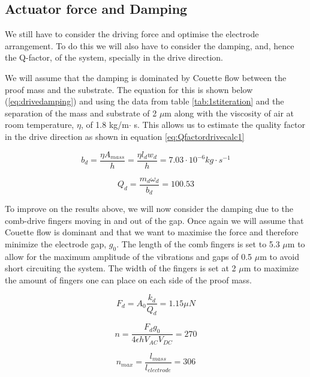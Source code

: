 \documentclass[12pt,a4paper,titlepage]{article}
\begin{document}
\begin{spacing}{1.1}
\subsection{Actuator force and Damping}

We still have to consider the driving force and optimise the electrode arrangement. To do this we will also have to consider the damping, and, hence the Q-factor, of the system, specially in the drive direction.

We will assume that the damping is dominated by Couette flow between the proof mass and the substrate. The equation for this is shown below (\ref{eq:drivedamping}) and using the data from table \ref{tab:1stiteration} and the separation of the mass and substrate of 2 $\mu$m along with the viscosity of air at room temperature, $\eta$, of 1.8 kg/m$\cdot$ s. This allows us to estimate the quality factor in the drive direction as shown in equation \ref{eq:Qfactordrivecalc1}

\begin{equation}
b_d = \dfrac{\eta A_{mass}}{h}= \dfrac{\eta l_d w_d}{h} = 7.03\cdot 10^{-6} kg \cdot s^{-1}
\label{eq:drivedamping}
\end{equation}

\begin{equation}
Q_d = \dfrac{m_d \omega_d}{b_d} = 100.53
\label{eq:Qfactordrivecalc1}
\end{equation}

To improve on the results above, we will now consider the damping due to the comb-drive fingers moving in and out of the gap. Once again we will assume that Couette flow is dominant and that we want to maximise the force and therefore minimize the electrode gap, $g_0$. The length of the comb fingers is set to 5.3 $\mu$m to allow for the maximum amplitude of the vibrations and gaps of 0.5 $\mu$m to avoid short circuiting the system. The width of the fingers is set at 2 $\mu$m to maximize the amount of fingers one can place on each side of the proof mass.

\begin{equation}
F_d = A_0 \dfrac{k_d}{Q_d} = 1.15 \mu N
\label{eq:driveforce1stapprox}
\end{equation}

\begin{equation}
n = \dfrac{F_d g_0}{4 \epsilon h V_{AC} V_{DC} } = 270
\label{eq:fingers1st}
\end{equation}

\begin{equation}
n_{max}= \dfrac{l_{mass}}{l_{electrode}} = 306
\label{eq:fingersmax}
\end{equation}


\end{spacing}
\end{document}
